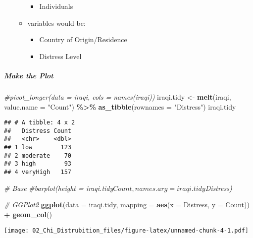 \documentclass[
]{article}
\newenvironment{Shaded}{\begin{snugshade}}{\end{snugshade}}
\newcommand{\CommentTok}[1]{\textcolor[rgb]{0.56,0.35,0.01}{\textit{#1}}}
\newcommand{\DataTypeTok}[1]{\textcolor[rgb]{0.13,0.29,0.53}{#1}}
\newcommand{\KeywordTok}[1]{\textcolor[rgb]{0.13,0.29,0.53}{\textbf{#1}}}
\newcommand{\NormalTok}[1]{#1}
\newcommand{\OperatorTok}[1]{\textcolor[rgb]{0.81,0.36,0.00}{\textbf{#1}}}
\newcommand{\StringTok}[1]{\textcolor[rgb]{0.31,0.60,0.02}{#1}}
\providecommand{\tightlist}{%
  \setlength{\itemsep}{0pt}\setlength{\parskip}{0pt}}
\begin{document}
\begin{itemize}
\begin{itemize}
    \begin{itemize}
    \tightlist
    \item
      Individuals
    \end{itemize}
  \item
    variables would be:

    \begin{itemize}
    \tightlist
    \item
      Country of Origin/Residence
    \item
      Distress Level
    \end{itemize}
  \end{itemize}
\end{itemize}

\hypertarget{make-the-plot}{%
\subparagraph{Make the Plot}\label{make-the-plot}}

\begin{Shaded}
\begin{Highlighting}[]
\CommentTok{\#pivot\_longer(data = iraqi, cols = names(iraqi))}
\NormalTok{iraqi.tidy <{-}}\StringTok{ }\KeywordTok{melt}\NormalTok{(iraqi, }\DataTypeTok{value.name =} \StringTok{"Count"}\NormalTok{) }\OperatorTok{\%>\%}\StringTok{ }\KeywordTok{as\_tibble}\NormalTok{(}\DataTypeTok{rownames =} \StringTok{"Distress"}\NormalTok{)}
\NormalTok{iraqi.tidy}
\end{Highlighting}
\end{Shaded}

\begin{verbatim}
## # A tibble: 4 x 2
##   Distress Count
##   <chr>    <dbl>
## 1 low        123
## 2 moderate    70
## 3 high        93
## 4 veryHigh   157
\end{verbatim}

\begin{Shaded}
\begin{Highlighting}[]
\CommentTok{\# Base}
\CommentTok{\#barplot(height = iraqi.tidy$Count, names.arg = iraqi.tidy$Distress)}

\CommentTok{\# GGPlot2}
\KeywordTok{ggplot}\NormalTok{(}\DataTypeTok{data =}\NormalTok{ iraqi.tidy, }\DataTypeTok{mapping =} \KeywordTok{aes}\NormalTok{(}\DataTypeTok{x =}\NormalTok{ Distress, }\DataTypeTok{y =}\NormalTok{ Count)) }\OperatorTok{+}\StringTok{ }
\StringTok{  }\KeywordTok{geom\_col}\NormalTok{()}
\end{Highlighting}
\end{Shaded}

\texttt{[image: 02\_Chi\_Distrubition\_files/figure-latex/unnamed-chunk-4-1.pdf]}
\end{document}
